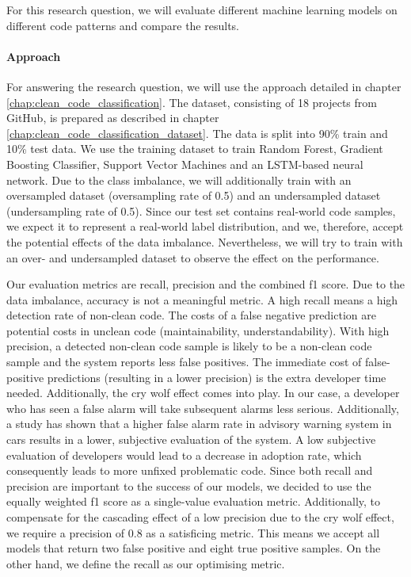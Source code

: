 For this research question, we will evaluate different machine learning models on different code patterns and compare the results.

\paragraph{Approach}
For answering the research question, we will use the approach detailed in chapter \ref{chap:clean_code_classification}.  The dataset, consisting of 18 projects from GitHub, is prepared as described in chapter \ref{chap:clean_code_classification_dataset}. The data is split into 90\% train and 10\% test data. We use the training dataset to train Random Forest, Gradient Boosting Classifier, Support Vector Machines and an LSTM-based neural network. Due to the class imbalance, we will additionally train with an oversampled dataset (oversampling rate of 0.5) and an undersampled dataset (undersampling rate of 0.5). Since our test set contains real-world code samples, we expect it to represent a real-world label distribution, and we, therefore, accept the potential effects of the data imbalance. Nevertheless, we will try to train with an over- and undersampled dataset to observe the effect on the performance.

Our evaluation metrics are recall, precision and the combined f1 score. Due to the data imbalance, accuracy is not a meaningful metric. A high recall means a high detection rate of non-clean code. The costs of a false negative prediction are potential costs in unclean code (maintainability, understandability). With high precision, a detected non-clean code sample is likely to be a non-clean code sample and the system reports less false positives. The immediate cost of false-positive predictions (resulting in a lower precision) is the extra developer time needed. Additionally, the cry wolf effect comes into play\cite{breznitz_cry_1984}. In our case, a developer who has seen a false alarm will take subsequent alarms less serious. Additionally, a study has shown that a higher false alarm rate in advisory warning system in cars results in a lower, subjective evaluation of the system\cite{naujoks_cooperative_2016}. A low subjective evaluation of developers would lead to a decrease in adoption rate, which consequently leads to more unfixed problematic code. Since both recall and precision are important to the success of our models, we decided to use the equally weighted f1 score as a single-value evaluation metric.
Additionally, to compensate for the cascading effect of a low precision due to the cry wolf effect, we require a precision of 0.8 as a satisficing metric. This means we accept all models that return two false positive and eight true positive samples. On the other hand, we define the recall as our optimising metric.

